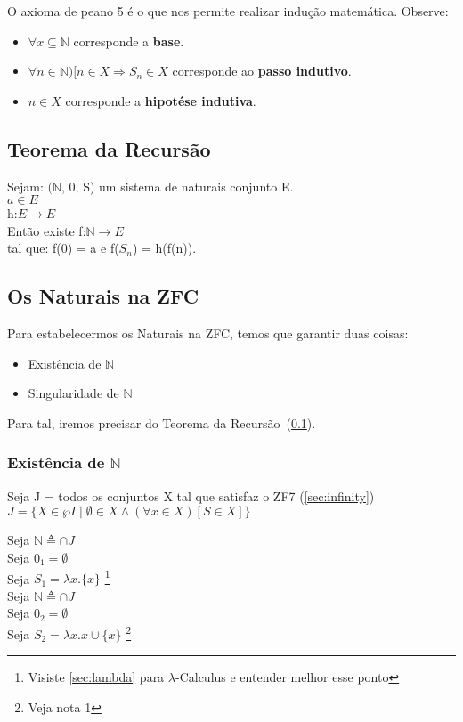 \documentclass[12pt, a4paper]{article}
\begin{document}
			O axioma de peano 5 \'e o que nos permite realizar indu\c{c}\~ao matem\'atica. Observe:
			\begin{itemize}
			\item $\forall x \subseteq \mathbb{N}$ corresponde a \textbf{base}.
			\item $\forall n \in \mathbb{N}) [n \in X \Rightarrow S_n \in X $ corresponde ao \textbf{passo indutivo}.
			\item $n \in X$ corresponde a \textbf{hipot\'ese indutiva}.
			\end{itemize}
		
		\subsection{Teorema da Recurs\~ao}
		\label{sec:recursion}
			Sejam: $(\mathbb{N}$, 0, S) um sistema de naturais conjunto E.\\
			$a \in E$\\
			h:$E \rightarrow E$\\
			Ent\~ao existe f:$ \mathbb{N} \rightarrow E$\\
			tal que: f(0) = a e f($S_n$) = h(f(n)).

		\subsection{Os Naturais na ZFC}
			Para estabelecermos os Naturais na ZFC, temos que garantir duas coisas:
			\begin{itemize}
			\item Exist\^encia de $\mathbb{N}$
			\item Singularidade de $\mathbb{N}$
			\end{itemize}

			Para tal, iremos precisar do Teorema da Recurs\~ao~(\ref{sec:recursion}).

			\subsubsection{Exist\^encia de $\mathbb{N}$}
				Seja J = todos os conjuntos X tal que satisfaz o ZF7 (\ref{sec:infinity})\\
				$J = \{X \in \wp I \mid \emptyset \in X \land (\forall x \in X)[S \in X]\}$\\
				\begin{multicols}{2}
				Seja $\mathbb{N} \triangleq \cap J$\\ 
				Seja $0_1 = \emptyset$\\ 
				Seja $S_1 = \lambda x.\{x\}$ \footnote{Visiste \ref{sec:lambda} para $\lambda$-Calculus e entender melhor esse ponto}\\ 

				Seja $\mathbb{N} \triangleq \cap J$\\
				Seja $0_2 = \emptyset$\\
				Seja $S_2 = \lambda x.x \cup \{x\} $ \footnote{Veja nota 1} 
				\end{multicols}
\end{document}

